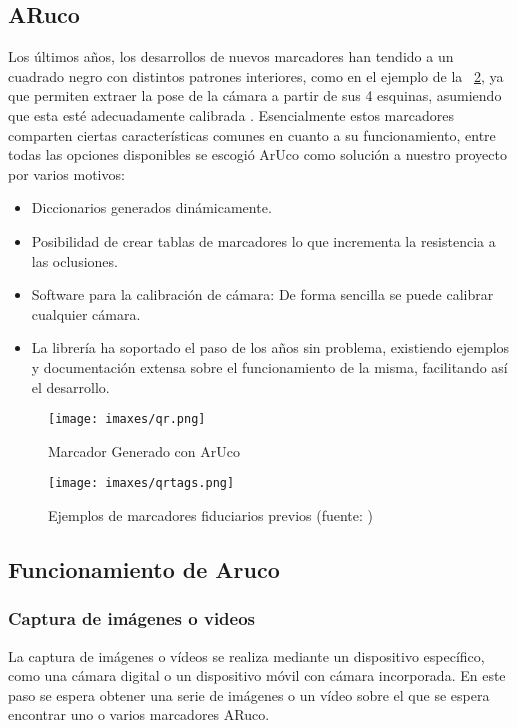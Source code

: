 \subsection{ARuco}
Los últimos años, los desarrollos de nuevos marcadores han tendido a un cuadrado negro con distintos patrones interiores, como en el ejemplo de la \figurename~\ref{fig:qrtags}, ya que permiten extraer la pose de la cámara a partir de sus 4 esquinas, asumiendo que esta esté adecuadamente calibrada \cite{GarridoJurado2014}. Esencialmente estos marcadores comparten ciertas características comunes en cuanto a su funcionamiento, entre todas las opciones disponibles se escogió ArUco como solución a nuestro proyecto por varios motivos:
\begin{itemize}
    \item Diccionarios generados dinámicamente.
    \item Posibilidad de crear tablas de marcadores lo que incrementa la resistencia a las oclusiones.
    \item Software para la calibración de cámara: De forma sencilla se puede calibrar cualquier cámara.
    \item La librería ha soportado el paso de los años sin problema, existiendo ejemplos y documentación extensa sobre el funcionamiento de la misma, facilitando así el desarrollo.
\end{itemize}

\begin{figure}
  \centering
  \texttt{[image: imaxes/qr.png]}
  \caption{Marcador Generado con ArUco}
  \label{fig:qr}
\end{figure}

\begin{figure}
  \centering
  \texttt{[image: imaxes/qrtags.png]}
  \caption{Ejemplos de marcadores fiduciarios previos (fuente: \cite{GarridoJurado2014})}
  \label{fig:qrtags}
\end{figure}

\subsection{Funcionamiento de Aruco}

\subsubsection*{Captura de imágenes o videos}
La captura de imágenes o vídeos se realiza mediante un dispositivo específico, como una cámara digital o un dispositivo móvil con cámara incorporada. En este paso se espera obtener una serie de imágenes o un vídeo sobre el que se espera encontrar uno o varios marcadores ARuco.
